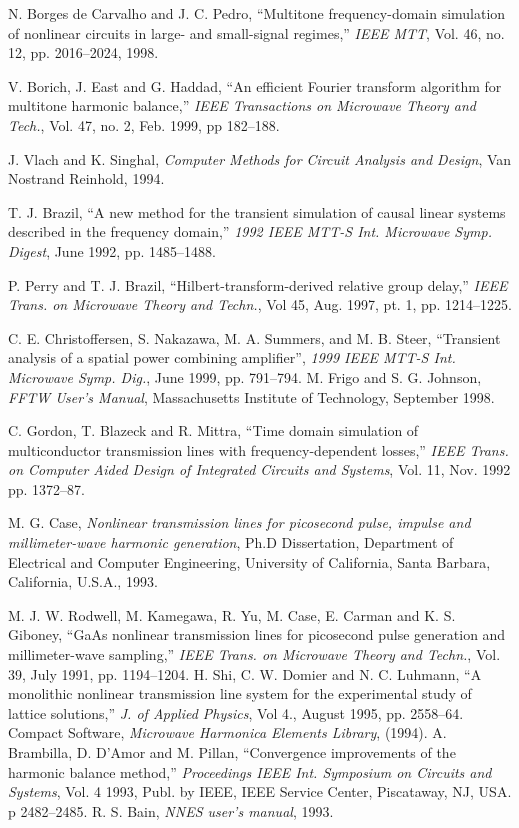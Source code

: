 \begin{thebibliography}{99}
 N. Borges de Carvalho and J. C. Pedro,
``Multitone frequency-domain simulation of nonlinear circuits in
large- and small-signal regimes,'' \emph{IEEE MTT}, Vol. 46, no.  12,
pp. 2016--2024, 1998.

 V. Borich, J. East and G. Haddad, ``An efficient
Fourier transform algorithm for multitone harmonic balance,''
\emph{IEEE Transactions on Microwave Theory and Tech.}, Vol. 47,
no. 2, Feb. 1999, pp 182--188.

 J. Vlach and K. Singhal, \emph{Computer
Methods for Circuit Analysis and Design}, Van Nostrand Reinhold, 1994.

 T. J. Brazil, ``A new method for the transient
simulation of causal linear systems described in the frequency
domain,'' \emph{1992 IEEE MTT-S Int. Microwave Symp. Digest}, June
1992, pp. 1485--1488.

 P. Perry and T. J. Brazil, ``Hilbert-transform-derived
relative group delay,'' \emph{IEEE Trans. on Microwave Theory
and Techn.}, Vol 45, Aug. 1997, pt. 1, pp. 1214--1225.

 C. E. Christoffersen, S. Nakazawa, M. A. Summers, and
M. B. Steer, ``Transient analysis of a spatial power combining
amplifier'', \emph{1999 IEEE MTT-S Int. Microwave Symp. Dig.}, June
1999, pp. 791--794.
%
 M. Frigo and S. G. Johnson, \emph{FFTW User's Manual},
Massachusetts Institute of Technology, September 1998.

 C. Gordon, T. Blazeck and R. Mittra, ``Time
domain simulation of multiconductor transmission lines with
frequency-dependent losses,'' \emph{IEEE Trans. on Computer
Aided Design of Integrated Circuits and Systems}, Vol. 11, Nov. 1992
pp. 1372--87.

 M. G. Case, \emph{Nonlinear transmission lines
for picosecond pulse, impulse and millimeter-wave harmonic
generation}, Ph.D Dissertation, Department of Electrical and Computer
Engineering, University of California, Santa Barbara, California,
U.S.A., 1993.

 M. J. W. Rodwell, M. Kamegawa, R. Yu, M. Case,
E. Carman and K. S. Giboney, ``GaAs nonlinear transmission lines for
picosecond pulse generation and millimeter-wave sampling,'' \emph{IEEE
Trans. on Microwave Theory and Techn.}, Vol. 39, July 1991,
pp. 1194--1204.
%
 H. Shi, C. W. Domier and N. C. Luhmann, ``A monolithic
nonlinear transmission line system for the experimental study of
lattice solutions,'' \emph{J. of Applied Physics}, Vol 4., August
1995, pp. 2558--64.
%
 Compact Software, \emph{Microwave Harmonica
Elements Library}, (1994).
%
 A. Brambilla, D. D'Amor and M. Pillan,
``Convergence improvements of the harmonic balance method,''
\emph{Proceedings IEEE Int. Symposium on Circuits and
Systems}, Vol. 4 1993, Publ. by IEEE, IEEE Service Center, Piscataway,
NJ, USA. p 2482--2485.
%
 R. S. Bain, \emph{NNES user's manual}, 1993.


\end{thebibliography}
